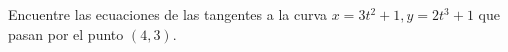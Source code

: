 \item Encuentre las ecuaciones de las tangentes a la curva $x = 3t^2 + 1, y = 2t^3 + 1$ que pasan por el punto $(4, 3)$.
